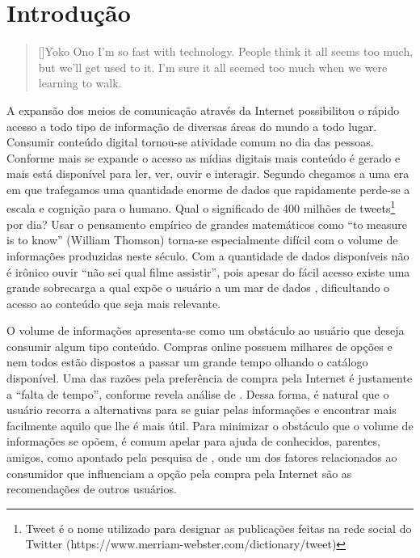 \chapter{Introdução}
\label{cap:introducao}

\begin{quotation}[]{Yoko Ono}
I'm so fast with technology. People think it all seems too much, but we'll get used to it. I'm sure it all seemed too much when we were learning to walk.
\end{quotation}

A expansão dos meios de comunicação através da Internet possibilitou o rápido acesso a todo tipo de informação de diversas áreas do mundo a todo lugar. Consumir conteúdo digital tornou-se atividade comum no dia das pessoas. Conforme mais se expande o acesso as mídias digitais mais conteúdo é gerado e mais está disponível para ler, ver, ouvir e interagir. Segundo \cite{Walker:2014} chegamos a uma era em que trafegamos uma quantidade enorme de dados que rapidamente perde-se a escala e cognição para o humano. Qual o significado de 400 milhões de tweets\footnote{Tweet é o nome utilizado para designar as publicações feitas na rede social do Twitter (https://www.merriam-webster.com/dictionary/tweet)} por dia? Usar o pensamento empírico de grandes matemáticos como “to measure is to know” (William Thomson) torna-se especialmente difícil com o volume de informações produzidas neste século. Com a quantidade de dados disponíveis não é irônico ouvir “não sei qual filme assistir”, pois apesar do fácil acesso existe uma grande sobrecarga a qual expõe o usuário a um mar de dados \citep{Wellman:BigData}, dificultando o acesso ao conteúdo que seja mais relevante.

O volume de informações apresenta-se como um obstáculo ao usuário que deseja consumir algum tipo conteúdo. Compras online possuem milhares de opções e nem todos estão dispostos a passar um grande tempo olhando o catálogo disponível. Uma das razões pela preferência de compra pela Internet é justamente a “falta de tempo”, conforme revela análise de \cite{Mykolas:2015a}. Dessa forma, é natural que o usuário recorra a alternativas para se guiar pelas informações e encontrar mais facilmente aquilo que lhe é mais útil. Para minimizar o obstáculo que o volume de informações se opõem, é comum apelar para ajuda de conhecidos, parentes, amigos, como apontado pela pesquisa de \cite{Mykolas:2015a}, onde um dos fatores relacionados ao consumidor que influenciam a opção pela compra pela Internet são as recomendações de outros usuários.

